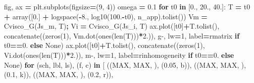 \documentclass[
  a4paper,
  numbers=noendperiod,
  DIV=12]{scrreprt}
\newenvironment{Shaded}{\begin{snugshade}}{\end{snugshade}}
\newcommand{\BuiltInTok}[1]{#1}
\newcommand{\ControlFlowTok}[1]{\textcolor[rgb]{0.13,0.29,0.53}{\textbf{#1}}}
\newcommand{\DecValTok}[1]{\textcolor[rgb]{0.00,0.00,0.81}{#1}}
\newcommand{\FloatTok}[1]{\textcolor[rgb]{0.00,0.00,0.81}{#1}}
\newcommand{\KeywordTok}[1]{\textcolor[rgb]{0.13,0.29,0.53}{\textbf{#1}}}
\newcommand{\NormalTok}[1]{#1}
\newcommand{\OperatorTok}[1]{\textcolor[rgb]{0.81,0.36,0.00}{\textbf{#1}}}
\newcommand{\StringTok}[1]{\textcolor[rgb]{0.31,0.60,0.02}{#1}}
\newcommand{\VariableTok}[1]{\textcolor[rgb]{0.00,0.00,0.00}{#1}}
\newcommand{\VerbatimStringTok}[1]{\textcolor[rgb]{0.31,0.60,0.02}{#1}}
\begin{document}
\begin{Shaded}
\begin{Highlighting}[]
\NormalTok{fig, ax }\OperatorTok{=}\NormalTok{ plt.subplots(figsize}\OperatorTok{=}\NormalTok{(}\DecValTok{9}\NormalTok{, }\DecValTok{4}\NormalTok{))}
\NormalTok{omega }\OperatorTok{=} \FloatTok{0.1}
\ControlFlowTok{for}\NormalTok{ t0 }\KeywordTok{in}\NormalTok{ [}\FloatTok{0.}\NormalTok{, }\FloatTok{20.}\NormalTok{, }\FloatTok{40.}\NormalTok{]:}
\NormalTok{    T }\OperatorTok{=}\NormalTok{ t0 }\OperatorTok{+}\NormalTok{ array([}\FloatTok{0.}\NormalTok{] }\OperatorTok{+}\NormalTok{ logspace(}\OperatorTok{{-}}\FloatTok{8.}\NormalTok{, log10(}\FloatTok{100.}\OperatorTok{{-}}\NormalTok{t0), n\_app).tolist())}
\NormalTok{    Vm }\OperatorTok{=}\NormalTok{ Cvisco\_G(Js\_m, T)}\OperatorTok{;}\NormalTok{  Vi }\OperatorTok{=}\NormalTok{ Cvisco\_G(Js\_i, T)}
\NormalTok{    ax.plot([t0]}\OperatorTok{+}\NormalTok{T.tolist(), concatenate((zeros(}\DecValTok{1}\NormalTok{), Vm.dot(ones(}\BuiltInTok{len}\NormalTok{(T)))}\OperatorTok{*}\FloatTok{2.}\NormalTok{)),}
            \StringTok{\textquotesingle{}g{-}\textquotesingle{}}\NormalTok{, lw}\OperatorTok{=}\DecValTok{1}\NormalTok{, label}\OperatorTok{=}\VerbatimStringTok{r\textquotesingle{}matrix\textquotesingle{}} \ControlFlowTok{if}\NormalTok{ t0}\OperatorTok{==}\FloatTok{0.} \ControlFlowTok{else} \VariableTok{None}\NormalTok{)}
\NormalTok{    ax.plot([t0]}\OperatorTok{+}\NormalTok{T.tolist(), concatenate((zeros(}\DecValTok{1}\NormalTok{), Vi.dot(ones(}\BuiltInTok{len}\NormalTok{(T)))}\OperatorTok{*}\FloatTok{2.}\NormalTok{)),}
            \StringTok{\textquotesingle{}m{-}\textquotesingle{}}\NormalTok{, lw}\OperatorTok{=}\DecValTok{1}\NormalTok{, label}\OperatorTok{=}\VerbatimStringTok{r\textquotesingle{}inhomogeneity\textquotesingle{}} \ControlFlowTok{if}\NormalTok{ t0}\OperatorTok{==}\FloatTok{0.} \ControlFlowTok{else} \VariableTok{None}\NormalTok{)}
    \ControlFlowTok{for}\NormalTok{ (sch, lbl, ls), (f, c) }\KeywordTok{in}\NormalTok{ [}
\NormalTok{            ((MAX, }\StringTok{\textquotesingle{}MAX\textquotesingle{}}\NormalTok{, }\StringTok{\textquotesingle{}{-}\textquotesingle{}}\NormalTok{),  (}\FloatTok{0.05}\NormalTok{, }\StringTok{\textquotesingle{}b\textquotesingle{}}\NormalTok{)),}
\NormalTok{            ((MAX, }\StringTok{\textquotesingle{}MAX\textquotesingle{}}\NormalTok{, }\StringTok{\textquotesingle{}{-}\textquotesingle{}}\NormalTok{),  (}\FloatTok{0.1}\NormalTok{,  }\StringTok{\textquotesingle{}k\textquotesingle{}}\NormalTok{)),}
\NormalTok{            ((MAX, }\StringTok{\textquotesingle{}MAX\textquotesingle{}}\NormalTok{, }\StringTok{\textquotesingle{}{-}\textquotesingle{}}\NormalTok{),  (}\FloatTok{0.2}\NormalTok{,  }\StringTok{\textquotesingle{}r\textquotesingle{}}\NormalTok{)),}

\end{Highlighting}
\end{Shaded}
\end{document}
